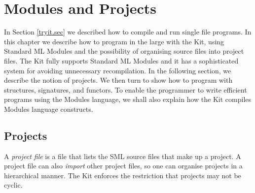\documentclass[12pt]{book}
\begin{document}
\chapter{Modules and Projects}
\label{modules_and_projects.chap}
In Section \ref{tryit.sec} we described how to compile and run single
file programs. In this chapter we describe how to program in the
large with the Kit, using 
% 
Standard ML Modules and the possibility of organising source files
into project files. The Kit fully supports Standard ML Modules and it
has a sophisticated system for avoiding unnecessary recompilation. In
the following section, we describe the notion of projects. We then
turn to show how to program with structures, signatures, and functors.
To enable the programmer to write efficient programs using the Modules
language, we shall also explain how the Kit compiles Modules language
constructs.


\section{Projects \label{projects.sec}}
A 
%
%
{\em project file\/} is a file that lists the SML source files
that make up a project. A project file can also 
%
{\em import\/} other project files, so one can organise projects in a
hierarchical manner.  The Kit enforces the restriction that projects
may not be cyclic.
\end{document}
